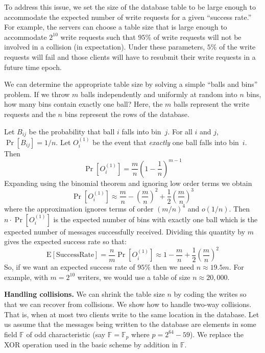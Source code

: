 \documentclass[10pt,twocolumn]{article}
\newcommand{\E}{\textrm{E}}
\newcommand{\F}{\mathbb{F}}
\newcommand{\nicepara}[1]{\medskip\noindent\textbf{#1.}}
\begin{document}
To address this issue,
we set the size of the database table to 
be large enough to accommodate the expected number 
of write requests for a given ``success rate.''
For example, the servers can choose a table size
that is large enough to accommodate $2^{10}$ write requests
such that $95\%$ of write requests
will not be involved in a collision (in expectation).
Under these parameters, $5\%$ of the write
requests will fail and those clients will have to
resubmit their write requests in a future time epoch.

We can determine the appropriate table size by solving
a simple ``balls and bins'' problem.
If we throw $m$ balls independently and uniformly at
random into $n$ bins, how many bins contain exactly one ball?
Here, the $m$ balls represent the write requests
and the $n$ bins represent the rows of the database.

Let $B_{ij}$ be the probability that ball $i$
falls into bin~$j$. For all $i$ and $j$, $\Pr[B_{ij}] = 1/n$.
Let $O_i^{(1)}$ be the event that {\em exactly} one ball falls
into bin~$i$.  Then
\[ \Pr\left[O_{i}^{(1)}\right] =  
                       \frac{m}{n}\left(1-\frac{1}{n}\right)^{m-1}  
\]
Expanding using the binomial theorem and ignoring low order terms
we obtain 
\[  \Pr\left[O_{i}^{(1)}\right] \approx         
                \frac{m}{n} -  \left(\frac{m}{n}\right)^2 + 
                \frac{1}{2}\left(\frac{m}{n}\right)^3
\]
where the approximation ignores terms of order $(m/n)^4$ and $o(1/n)$.
Then $n \cdot \Pr[O_{i}^{(1)}]$ is the expected number of bins
with exactly one ball which is the expected number of messages 
successfully received.  
Dividing this quantity by $m$ gives the expected success rate so that:
\[  \E[\text{SuccessRate}] = \frac{n}{m} \Pr[O_{i}^{(1)}] \approx 
      1 - \frac{m}{n} + \frac{1}{2} \left(\frac{m}{n}\right)^2  \]
So, if we want an expected success rate of $95\%$ then we need
$n \approx 19.5 m$.  For example, with $m = 2^{10}$ writers,
we would use a table of size $n \approx 20,000$. 



\nicepara{Handling collisions}  We can shrink the table
size $n$ by coding the writes so that we can recover from collisions.
We show how to handle two-way collisions. 
That is, when at most two
clients write to the same location in the database.  Let us assume
that the messages being written to the database are elements in some
field $\F$ of odd characteristic (say $\F = \F_p$ where $p=2^{64}-59$).
We replace the XOR operation used in the basic scheme
by addition in $\F$.   
\end{document}

